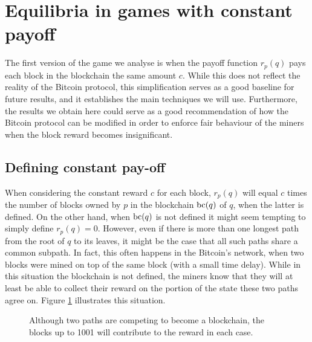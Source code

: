

\section{Equilibria in games with constant payoff}
\label{sec-const_rew}

The first version of the game we analyse is when the payoff function $r_p(q)$ pays each block in the blockchain the same amount $c$. While this does not reflect the reality of the Bitcoin protocol, this simplification serves as a good baseline for future results, and it establishes the main techniques we will use. Furthermore, the results we obtain here could serve as a good recommendation of how the Bitcoin protocol can be modified in order to enforce fair behaviour of the miners when the block reward becomes insignificant.

\subsection{Defining constant pay-off}
When considering the constant reward $c$ for each block, $r_p(q)$ will equal $c$ times the number of blocks owned by $p$ in the blockchain $\text{bc}(q)$ of $q$, when the latter is defined. On the other hand, when $\text{bc}(q)$ is not defined it might seem tempting to simply define $r_p(q) = 0$. However, even if there is more than one longest path from the root of $q$ to its leaves, it might be the case that all such paths share a common subpath. In fact, this often happens in the Bitcoin's network, when two blocks were mined on top of the same block (with a small time delay). While in this situation the blockchain is not defined, the miners know that they will at least be able to collect their reward on the portion of the state these two paths agree on. Figure \ref{fig-simple-fork} illustrates this situation. 

\begin{figure}
\begin{center}
\end{center}
\caption{Although two paths are competing to become a blockchain, the blocks up to 1001 will contribute to the reward in each case. \label{fig-simple-fork}}
\end{figure}

